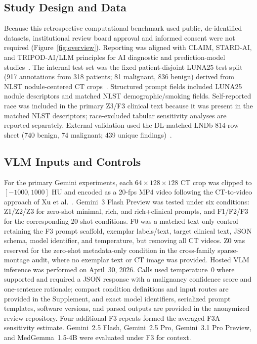 \documentclass[11pt]{article}
\begin{document}
\subsection{Study Design and Data}

Because this retrospective computational benchmark used public, de-identified datasets, institutional review board approval and informed consent were not required (Figure~\ref{fig:overview}). Reporting was aligned with CLAIM, STARD-AI, and TRIPOD-AI/LLM principles for AI diagnostic and prediction-model studies~\citep{ref-claim,ref-stard-ai,ref-tripod-ai,ref-tripod-llm}. The internal test set was the fixed patient-disjoint LUNA25 test split (917 annotations from 318 patients; 81 malignant, 836 benign) derived from NLST nodule-centered CT crops~\citep{peeters2025luna25ann,peeters2025luna25img}. Structured prompt fields included LUNA25 nodule descriptors and matched NLST demographic/smoking fields. Self-reported race was included in the primary Z3/F3 clinical text because it was present in the matched NLST descriptors; race-excluded tabular sensitivity analyses are reported separately. External validation used the DL-matched LNDb 814-row sheet (740 benign, 74 malignant; 439 unique findings)~\citep{pedrosa2019lndb}.

\subsection{VLM Inputs and Controls}

For the primary Gemini experiments, each $64\times128\times128$ CT crop was clipped to $[-1000,1000]$ HU and encoded as a 20-fps MP4 video following the CT-to-video approach of Xu et al.~\citep{ref-xu2026}. Gemini~3 Flash Preview was tested under six conditions: Z1/Z2/Z3 for zero-shot minimal, rich, and rich+clinical prompts, and F1/F2/F3 for the corresponding 20-shot conditions. F0 was a matched text-only control retaining the F3 prompt scaffold, exemplar labels/text, target clinical text, JSON schema, model identifier, and temperature, but removing all CT videos. Z0 was reserved for the zero-shot metadata-only condition in the cross-family sparse-montage audit, where no exemplar text or CT image was provided. Hosted VLM inference was performed on April~30, 2026. Calls used temperature~0 where supported and required a JSON response with a malignancy confidence score and one-sentence rationale; compact condition definitions and input routes are provided in the Supplement, and exact model identifiers, serialized prompt templates, software versions, and parsed outputs are provided in the anonymized review repository. Four additional F3 repeats formed the averaged F3A sensitivity estimate. Gemini~2.5 Flash, Gemini~2.5 Pro, Gemini~3.1 Pro Preview, and MedGemma~1.5-4B were evaluated under F3 for context.
\end{document}
